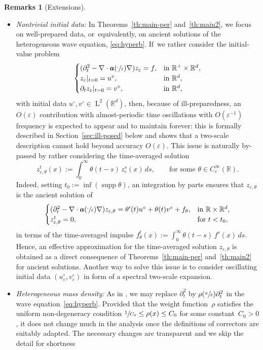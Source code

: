\documentclass[JEP,XML,SOM,Unicode,published]{cedram}
\theoremstyle{plain}
\theoremstyle{definition}
\newtheorem{rems0}[theor0]{Remarks}
\newenvironment{rems}
{\renewcommand{\qedsymbol}{$\lozenge$}\pushQED{\qed}\begin{rems0}}
{\popQED\end{rems0}}
\numberwithin{equation}{section}
\newcommand{\e}{\varepsilon}
\newcommand{\R}{\mathbb R}
\newcommand{\Aa}{\boldsymbol a}
\newcommand{\Ld}{\operatorname{L}}
\newcommand{\supp}{\operatorname{supp}}
\begin{document}
\skpt
\begin{rems}[Extensions]\label{rem:ill-prepared}
\begin{itemize}
\item {\it Nontrivial initial data:}
In Theorems~\ref{th:main-per} and~\ref{th:main2}, we focus on well-prepared data, or~equivalently, on ancient solutions of the heterogeneous wave equation, \cf \eqref{eq:hyperb}.
If~we rather consider the initial-value problem
\begin{equation*}
\begin{cases}
(\partial_t^2-\nabla\cdot\Aa(\sfrac\cdot\e)\nabla)z_\e=f,&\text{in $\R^+\times\R^d$},\\
z_\e|_{t=0}=u^\circ,&\text{in $\R^d$},\\
\partial_tz_\e|_{t=0}=v^\circ,&\text{in $\R^d$},
\end{cases}
\end{equation*}
with initial data $u^\circ,v^\circ\in\Ld^2(\R^d)$,
then, because of ill-preparedness, an $O(\e)$ contribution with almost-periodic time oscillations with $O(\e^{-1})$ frequency is expected to appear and to maintain forever: this is formally described in Section~\ref{sec:ill-posed} below and shows that a two-scale description cannot hold beyond accuracy $O(\e)$.
This issue is naturally by-passed by rather considering the time-averaged solution
\[z_{\e,\theta}^t(x):=\int_0^\infty\theta(t-s)\,z_\e^s(x)\,ds,\qquad\text{for some $\theta\in C^\infty_c(\R)$.}\]
Indeed, setting $t_0:=\inf(\supp\theta)$, an integration by parts ensures that $z_{\e,\theta}$ is the ancient solution of
\begin{gather}\label{eq:time-average-form}
\begin{cases}
(\partial_t^2-\nabla\cdot\Aa(\sfrac\cdot\e)\nabla)z_{\e,\theta}=\theta'(t)u^\circ+\theta(t) v^\circ+f_\theta,&\text{in $\R\times\R^d$},\\
z_{\e,\theta}^t=0,&\text{for $t<t_0$},
\end{cases}
\end{gather}
{in terms of the time-averaged impulse $f_\theta^t(x):=\int_0^\infty\theta(t-s)\,f^s(x)\,ds$.}
Hence, an effective approximation for the time-averaged solution $z_{\e,\theta}$ is obtained as a direct consequence of Theorems~\ref{th:main-per} and~\ref{th:main2} for ancient solutions.
{Another way to solve this issue is to consider oscillating initial data $(u^\circ_\e,v^\circ_\e)$ in form
of a spectral two-scale expansion.}

\item {\it Heterogeneous mass density:}
As in \cite{ALR}, we may replace $\partial_t^2$ by $\rho(\sfrac x\e)\partial_t^2$ in the wave equation~\eqref{eq:hyperb}. Provided that the weight function~$\rho$ satisfies the uniform non-degeneracy condition $\sfrac1{C_0}\le\rho(x)\le C_0$ for some constant~$C_0>0$, it does not change much in the analysis once the definitions of correctors are suitably adapted. The necessary changes are transparent and we skip the detail for shortness\qedhere
\end{itemize}
\end{rems}
\end{document}
